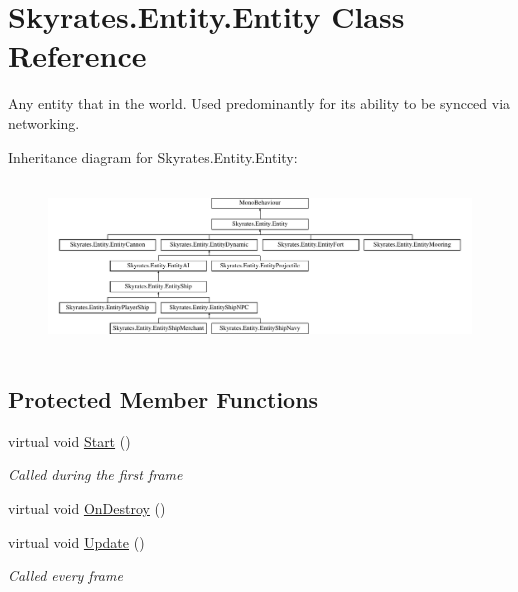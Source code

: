 \hypertarget{class_skyrates_1_1_entity_1_1_entity}{\section{Skyrates.\-Entity.\-Entity Class Reference}
\label{class_skyrates_1_1_entity_1_1_entity}
}


Any entity that in the world. Used predominantly for its ability to be syncced via networking.  


Inheritance diagram for Skyrates.\-Entity.\-Entity\-:\begin{figure}[H]
\begin{center}
\leavevmode
\includegraphics[height=4.495413cm]{class_skyrates_1_1_entity_1_1_entity}
\end{center}
\end{figure}
\subsection*{Protected Member Functions}
\begin{DoxyCompactItemize}
\item 
virtual void \hyperlink{class_skyrates_1_1_entity_1_1_entity_a014d40273b5d21520736b76ba9aaca92}{Start} ()
\begin{DoxyCompactList}\small\item\em Called during the first frame \end{DoxyCompactList}\item 
virtual void \hyperlink{class_skyrates_1_1_entity_1_1_entity_a71bdbbafe56a60c3f15e2dae9ce8349d}{On\-Destroy} ()
\item 
virtual void \hyperlink{class_skyrates_1_1_entity_1_1_entity_a047df58574baa9b7eab73adf9dfd9707}{Update} ()
\begin{DoxyCompactList}\small\item\em Called every frame \end{DoxyCompactList}\end{DoxyCompactItemize}


